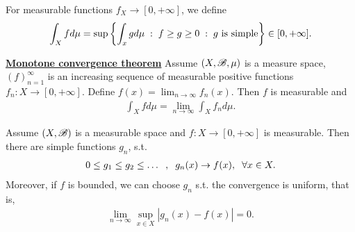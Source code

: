 \begin{definition}
    For measurable functions $f_X\rightarrow [0,+\infty]$, we define \begin{align*}
        \int_X fd\mu = \sup\left\{\int_xgd\mu \hspace{1mm}:\hspace{1mm} f\geq g\geq 0\hspace{1mm}:\hspace{1mm} g \text{ is simple}\right\}\in[0,+\infty].
    \end{align*}
\end{definition}

\begin{theorem}{\underline{\textbf{Monotone convergence theorem}}}
    Assume $(X,\mathscr{B},\mu)$ is a measure space, $(f)_{n=1}^\infty$ is an increasing sequence of measurable positive functions $f_n:X\rightarrow [0,+\infty]$. Define $f(x)=\lim_{n\rightarrow \infty}f_n(x)$. 
    Then $f$ is measurable and  \begin{align*}
        \int_X fd\mu = \lim_{n\rightarrow \infty} \int_X f_nd\mu.
    \end{align*}
    
\end{theorem}

\begin{theorem}
    Assume $(X,\mathscr{B})$ is a measurable space and $f:X\rightarrow [0,+\infty]$ is measurable. Then there are simple functions $g_n$, s.t. \begin{align*}
        0\leq g_1\leq g_2\leq\ldots \hspace{2mm},\hspace{2mm} g_n(x)\rightarrow f(x),\hspace{2mm}\forall x\in X.
    \end{align*}
    Moreover, if $f$ is bounded, we can choose $g_n$ s.t. the convergence is uniform, that is, \begin{align*}
        \lim_{n\rightarrow\infty}\sup_{x\in X}|g_n(x)-f(x)|=0.
    \end{align*}
\end{theorem}